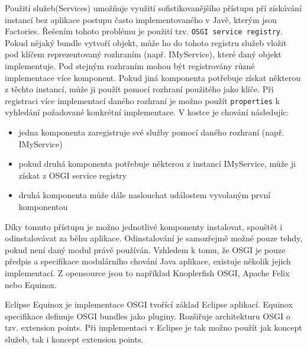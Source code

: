 \documentclass[ing,male,java,dept460]{diploma}		%
\begin{document}
\par Použití služeb(Services) umožňuje využití sofistikovanějšího přístupu pří získávání instancí bez aplikace postupu často implementovaného v Javě, kterým jsou Factories. Řešením tohoto problému je použití tzv. \texttt{OSGI service registry}. Pokud nějaký bundle vytvoří objekt, může ho do tohoto registru služeb vložit pod klíčem reprezentovaný rozhraním (např. IMyService), které daný objekt implementuje. Pod stejným rozhraním mohou být registrovány různé implementace více komponent. Pokud jiná komponenta potřebuje získat některou z těchto instancí, může ji použít pomocí rozhraní použitého jako klíče. Při registraci více implementací daného rozhraní je možno použít \texttt{properties} k vyhledání požadované konkrétní implementace. V kostce je chování následujíc\cite{osgiArchitecture}:
\begin{itemize}
	\item jedna komponenta zaregistruje své služby pomocí daného rozhraní (např. IMyService)
	\item pokud druhá komponenta potřebuje některou z instancí IMyService, může ji získat z OSGI service registry
	\item druhá komponenta může dále naslouchat událostem vyvolaným první komponentou
\end{itemize}
\par Díky tomuto přístupu je možno jednotlivé komponenty instalovat, spouštět i odinstalovávat za běhu aplikace. Odinstalování je samozřejmě možné pouze tehdy, pokud není daný modul právě používán. Vzhledem k tomu, že OSGI je pouze předpis a specifikace modulárního chování Java aplikace, existuje několik jejich implementací. Z opensource jsou to například Knoplerfish OSGI, Apache Felix nebo Equinox.
\par Eclipse Equinox je implementace OSGI tvořící základ Eclipse aplikací. Equinox specifikace definuje OSGI bundles jako pluginy. Rozšiřuje architekturu OSGI o tzv. extension points. Při implementaci v Eclipse je tak možno použít jak koncept služeb, tak i koncept extension points\cite{vogellaOsgi}.
\end{document}

